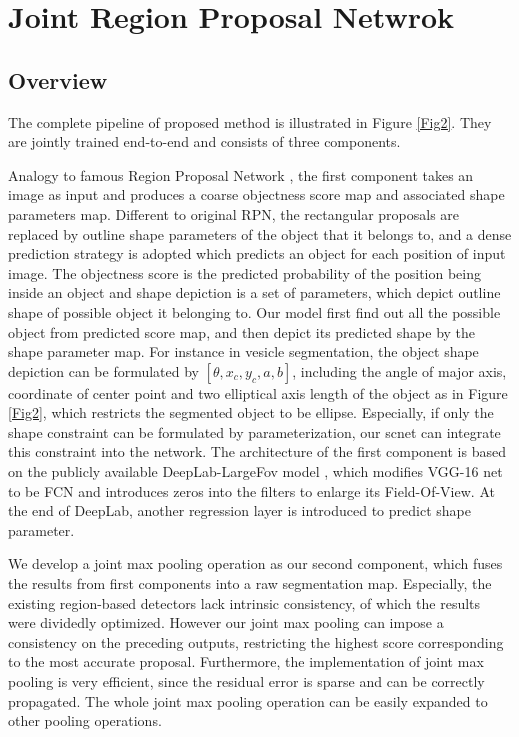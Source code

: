 \documentclass[10pt,twocolumn,letterpaper]{article}
\begin{document}
\section{Joint Region Proposal Netwrok}
\subsection{Overview}
The complete pipeline of proposed method is illustrated in Figure \ref{Fig2}.
They are jointly trained end-to-end and consists of three components.

Analogy to famous Region Proposal Network \cite{Ren2015}, the first component takes an image as input and produces a coarse objectness score map and associated shape parameters map.
Different to original RPN, the rectangular proposals are replaced by outline shape parameters of the object that it belongs to, and a dense prediction strategy is adopted which predicts an object for each position of input image.
The objectness score is the predicted probability of the position being inside an object and shape depiction is a set of parameters, which depict outline shape of possible object it belonging to.
Our model first find out all the possible object from predicted score map, and then depict its predicted shape by the shape parameter map.
For instance in vesicle segmentation, the object shape depiction can be formulated by $[\theta,x_c,y_c,a,b]$, including the angle of major axis, coordinate of center point and two elliptical axis length of the object as in Figure \ref{Fig2}, which restricts the segmented object to be ellipse.
Especially, if only the shape constraint can be formulated by parameterization, our scnet can integrate this constraint into the network.
The architecture of the first component is based on the publicly available DeepLab-LargeFov model \cite{Chen2014}, which modifies VGG-16 net \cite{Simonyan2014} to be FCN \cite{Long2015} and introduces zeros into the filters to enlarge its Field-Of-View.
At the end of DeepLab, another regression layer is introduced to predict shape parameter.

We develop a joint max pooling operation as our second component, which fuses the results from first components into a raw segmentation map.
Especially, the existing region-based detectors lack intrinsic consistency, of which the results were dividedly optimized.
However our joint max pooling can impose a consistency on the preceding outputs, restricting the highest score corresponding to the most accurate proposal.
Furthermore, the implementation of joint max pooling is very efficient, since the residual error is sparse and can be correctly propagated.
The whole joint max pooling operation can be easily expanded to other pooling operations.
\end{document}
